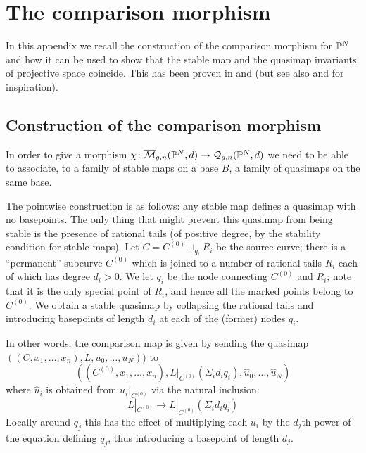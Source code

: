 \section{The comparison morphism} \label{Section comparison morphism}
In this appendix we recall the construction of the comparison morphism for $\mathbb P^N$ and how it can be used to show that the stable map and the quasimap invariants of projective space coincide. This has been proven in \cite[Theorem 3]{MOP} and \cite[Section 4.3]{Manolache-Push} (but see also \cite[Proposition 4.1]{Bertram} and \cite[Theorem 7.1]{Popa-Roth} for inspiration).

\subsection{Construction of the comparison morphism}
In order to give a morphism $\chi\colon\overline{\mathcal{M}}_{g,n}(\mathbb P^N,d)\rightarrow\mathcal{Q}_{g,n}(\mathbb P^N,d)$ we need to be able to associate, to a family of stable maps on a base $B$, a family of quasimaps on the same base.

The pointwise construction is as follows: any stable map defines a quasimap with no basepoints. The only thing that might prevent this quasimap from being stable is the presence of rational tails (of positive degree, by the stability condition for stable maps). Let $C=C^{(0)}\sqcup_{q_i}R_i$ be the source curve; there is a ``permanent'' subcurve $C^{(0)}$ which is joined to a number of rational tails $R_i$ each of which has degree $d_i>0$. We let $q_i$ be the node connecting $C^{(0)}$ and $R_i$; note that it is the only special point of $R_i$, and hence all the marked points belong to $C^{(0)}$. We obtain a stable quasimap by collapsing the rational tails and introducing basepoints of length $d_i$ at each of the (former) nodes $q_i$.

In other words, the comparison map is given by sending the quasimap $((C,x_1,\ldots,x_n),L,u_0,\ldots,u_N))$ to 
\begin{equation*}((C^{(0)},x_1,\ldots,x_n),L|_{C^{(0)}}(\Sigma_i d_i q_i),\hat{u}_0,\ldots,\hat{u}_N) \end{equation*}
where $\hat{u}_i$ is obtained from $u_i|_{C^{(0)}}$ via the natural inclusion:
\begin{equation*} L|_{C^{(0)}}\to L|_{C^{(0)}}(\Sigma_i d_i q_i) \end{equation*}
Locally around $q_j$ this has the effect of multiplying each $u_i$ by the $d_j$th power of the equation defining $q_j$, thus introducing a basepoint of length $d_j$.

